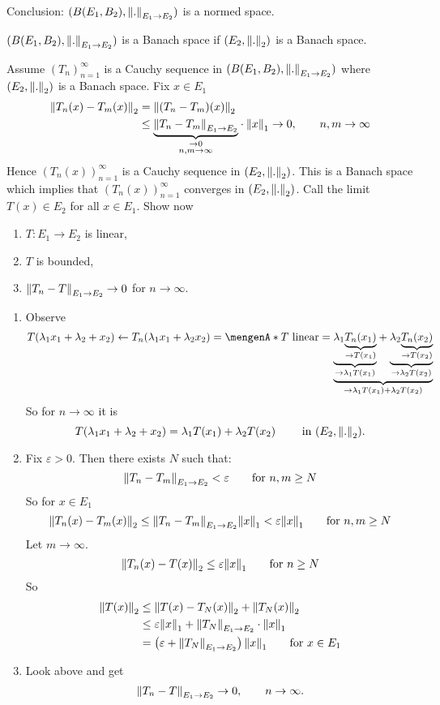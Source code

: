 Conclusion: $(B(E_1,B_2),\norm{.}_{E_1 \to E_2})$ is a normed space. 
\begin{satz}
	 $(B(E_1,B_2),\norm{.}_{E_1 \to E_2})$ is a Banach space if $(E_2,\norm{.}_2)$ is a Banach space.
\end{satz}
\begin{beweis}
	Assume $(T_n)_{n=1}^{\infty}$ is a Cauchy sequence in $(B(E_1,B_2),\norm{.}_{E_1 \to E_2})$ where $(E_2, \norm{.}_2)$ is a Banach space. Fix $x \in E_1$
	\begin{align*}
		\norm{T_n(x)-T_m(x)}_2 &= \norm{(T_n-T_m)(x)}_2  \\
		&\leq \underset{\substack{\to 0 \\ n,m \to \infty}}{\underbrace{\norm{T_n-T_m}_{E_1 \to E_2}}} \cdot \norm{x}_1 \to 0, \qquad n,m \to \infty
	\end{align*}
	Hence $(T_n(x))_{n=1}^{\infty}$ is a Cauchy sequence in $(E_2, \norm{.}_2)$. This is a Banach space which implies that $(T_n(x))_{n=1}^{\infty}$ converges in 
	$(E_2,\norm{.}_2)$. Call the limit $T(x) \in E_2$ for all $x \in E_1$. Show now 
	\begin{enumerate}[(1)]
		\item $T: E_1 \to E_2$ is linear,
		\item $T$ is bounded,
		\item $\norm{T_n - T}_{E_1 \to E_2} \to 0$ for $n \to \infty$.
	\end{enumerate}
	\begin{enumerate}[(1)]
		\item Observe 
		\begin{align*}
		T(\lambda_1 x_1 + \lambda_2 + x_2)\leftarrow T_n(\lambda_1 x_1 + \lambda_2 x_2) = \set{T \text{ linear}} = \underset{\to \lambda_1 T(x_1) + \lambda_2 T(x_2)}{\underbrace{\underset{\to \lambda_1 T(x_1)}{\underbrace{\lambda_1 \underset{\to T(x_1)}{\underbrace{T_n(x_1)}}}} + \underset{\to \lambda_2 T(x_2)}{\underbrace{\lambda_2 \underset{\to T(x_2)}{\underbrace{T_n(x_2)}}}}}}
		\end{align*}
		So for $n \to  \infty$ it is
		\[
			T(\lambda_1 x_1 + \lambda_2 + x_2) = \lambda_1 T(x_1) + \lambda_2 T(x_2) \qquad \text{ in }(E_2, \norm{.}_2).
		\]
		\item Fix $\varepsilon >0$. Then there exists $N$ such that:
		\[
			\norm{T_n- T_m}_{E_1 \to E_2} < \varepsilon \qquad \text{for }n,m \geq N
		\]
		So for $x \in E_1$
		\[
			\norm{T_n(x)-T_m(x)}_2 \leq \norm{T_n - T_m}_{E_1 \to E_2} \norm{x}_1 < \varepsilon \norm{x}_1 \qquad \text{for }n,m \geq N
		\]
		Let $m \to \infty$.
		\[
			\norm{T_n(x)- T(x)}_2 \leq \varepsilon \norm{x}_1 \qquad \text{for }n \geq N
 		\]
		So
		\begin{align*}
			\norm{T(x)}_2 &\leq  \norm{T(x)- T_N(x)}_2 + \norm{T_N(x)}_2 \\
			&\leq \varepsilon \norm{x}_1 + \norm{T_N}_{E_1 \to E_2} \cdot \norm{x}_1 \\
			&= \left( \varepsilon +  \norm{T_N}_{E_1 \to E_2} \right) \norm{x}_1 \qquad \text{for }x \in E_1
		\end{align*}
		\item Look above and get
		\[
			\norm{T_n - T}_{E_1 \to E_2} \to 0, \qquad  n \to \infty.
		\]
	\end{enumerate}
\end{beweis}
